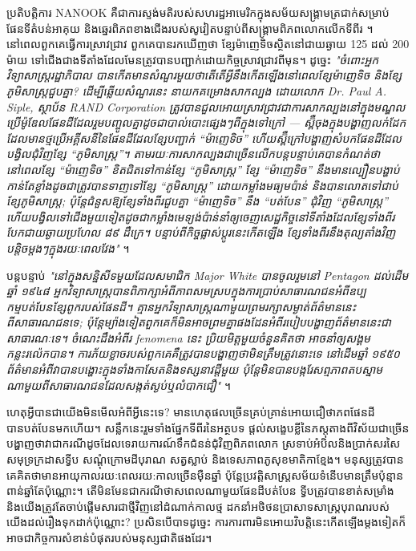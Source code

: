 \documentclass[10pt,twocolumn,letterpaper]{article}
\begin{document}
ប្រតិបត្តិការ NANOOK គឺជាការស្ទង់មតិរបស់សហរដ្ឋអាមេរិកក្នុងសម័យសង្គ្រាមត្រជាក់សម្រាប់ផែនទីតំបន់អាគុយ និងឆ្នេរពិភពខាងជើងរបស់សូវៀតបន្ទាប់ពីសង្គ្រាមពិភពលោកលើកទីពីរ \cite{137}។ នៅពេលពួកគេធ្វើការស្រាវជ្រាវ ពួកគេបានរកឃើញថា ខ្សែម៉ាញេទិចស្ថិតនៅជាយឆ្ងាយ 125 ដល់ 200 ម៉ាយ ទៅជើងជាងទីតាំងដែលមែនត្រូវបានបញ្ជាក់ដោយកិច្ចស្រាវជ្រាវពីមុន។ ដូច្នេះ \textit{"ចំពោះអ្នកវិទ្យាសាស្ត្ររដ្ឋាភិបាល បានកើតមានសំណួរមួយថាតើតើអ្វីនឹងកើតឡើងនៅពេលខ្សែម៉ាញេទិច និងខ្សែភូមិសាស្ត្រជួបគ្នា? ដើម្បីឆ្លើយសំណួរនេះ នាយកគម្រោងសាកល្បង ដោយលោក Dr. Paul A. Siple, ស្ថាប័ន RAND Corporation ត្រូវបានជួលអោយស្រាវជ្រាវជាការសាកល្បងនៅក្នុងមណ្ឌល ប្រើម៉ូឌែលផែនដីដែលរួមបញ្ចូលគ្នាដូចជាបាល់បោះផ្សេងៗពីក្នុងទៅក្រៅ — ស្ព៊ឺចុងក្នុងបង្ហាញលក់ដែកដែលមានថ្មប្រើអគ្គីសនីនៃផែនដីដែលខ្សែបញ្ជាក់ “ម៉ាញេទិច” ហើយស្ព៊ឺក្រៅបង្ហាញសំបកផែនដីដែលបង្វិលជុំវិញខ្សែ “ភូមិសាស្ត្រ”។ តាមរយៈការសាកល្បងជាច្រើនលើកបន្តបន្ទាប់គេបានកំណត់ថា នៅពេលខ្សែ “ម៉ាញេទិច” ខិតជិតទៅកាន់ខ្សែ “ភូមិសាស្ត្រ” ខ្សែ “ម៉ាញេទិច” នឹងមានល្បឿនបង្ហាប់កាន់តែខ្លាំងដូចជាត្រូវបានទាញទៅខ្សែ “ភូមិសាស្ត្រ” ដោយកម្លាំងមធ្យមប៉ាន់ និងបានលោតទៅជាប់ខ្សែភូមិសាស្ត្រ; ប៉ុន្តែជំនួសឱ្យខ្សែទាំងពីរជួបគ្នា “ម៉ាញេទិច” នឹង “បត់បែន” ជុំវិញ “ភូមិសាស្ត្រ” ហើយបង្វិលទៅជើងមួយទៀតដូចជាកម្លាំងមេទ្យង់ប៉ាន់នាំឲ្យចេញសេដ្ឋកិច្ចនៅទីតាំងដែលខ្សែទាំងពីរបែកជាយឆ្ងាយប្រហែល ៨៩ ដឺក្រេ។ បន្ទាប់ពីកិច្ចផ្លាស់ប្តូរនេះកើតឡើង ខ្សែទាំងពីរនឹងតុល្យតាំងវិញបន្តិចម្តងៗក្នុងរយៈពេលវែង"} \cite{138,139}។

បន្តបន្ទាប់ \textit{"នៅក្នុងសន្និសីទមួយដែល​សមាជិក Major White បានចូលរួមនៅ Pentagon ដល់ដើមឆ្នាំ ១៩៤៨ អ្នកវិទ្យាសាស្ត្របានពិភាក្សាអំពីភាពសមស្របក្នុងការប្រាប់សាធារណជនអំពីឧប្បកម្មបត់បែនខ្សែពូករបស់ផែនដី។ គ្មានអ្នកវិទ្យាសាស្ត្រណាមួយព្រមរក្សាសម្ងាត់ព័ត៌មាននេះពីសាធារណជនទេ; ប៉ុន្តែម្យ៉ាងទៀតពួកគេក៏មិនអាចព្រមគ្នាផងដែនអំពីរបៀបបង្ហាញព័ត៌មាននេះជាសាធារណៈទេ។ ចំណេះដឹងអំពីរ fenomena នេះ ប្រិយមិត្តមួយចំនួនគិតថា អាចនាំឲ្យសង្គមកន្លះរល៉េកបាន។ ការភ័យខ្លាចរបស់ពួកគេគឺត្រូវបានបង្ហាញថាមិនត្រឹមត្រូវនោះទេ នៅដើមឆ្នាំ ១៩៥០ ព័ត៌មានអំពីវាបានបង្ហោះក្នុងទាំងកាសែតនិងទស្សនាវដ្តីមួយ ប៉ុន្តែមិនបានបង្ករែសព្មភាពតបស្នាមណាមួយពីសាធារណជនដែលសង្កត់ស្ងប់ឬលំបាកជឿ"} \cite{138,139}។

ហេតុអ្វីបានជា​យើងមិនមើលអំពីអ្វីនេះទេ? មានហេតុផលច្រើនគ្រប់គ្រាន់អោយជឿថាភពផែនដីបានបត់បែនមកហើយ។ សន្លឹកនេះរួមទាំងផ្នែកទីពីរនៃអត្ថបទ ផ្ដល់សង្ខេបខ្លីនៃភស្តុតាងពីវិស័យជាច្រើនបង្ហាញថាវាជាករណីដូចដែលទេ​រាយការណ៍ទឹកជំនន់ជុំវិញពិភពលោក ស្រទាប់អំបិលនិងប្រាក់សរសៃសមុទ្រក្រដាសទ្វីប សណ្ដុំក្រោមដីបុរាណ សត្វស្លាប់ និងទេសភាពភូសុខមាតិកាខ្មែង។ មនុស្សត្រូវបានគេ​គិតថាមានអាយុកាលរយៈពេលរយ:កាលច្រើនម៉ឺនឆ្នាំ ប៉ុន្តែប្រវត្តិសាស្ត្រសម័យទំនើបមានត្រឹមប៉ុន្មានពាន់ឆ្នាំតែប៉ុណ្ណោះ។ តើមិនមែនជាករណីថាសពេលណាមួយផែនដីបត់បែន ទ្វីបត្រូវបានខាត់សម្រាំង និងយើងត្រូវតែចាប់ផ្តើមសារជាថ្មីវិញនៅដំណាក់កាលថ្ម ដកនាំអថិថនប្រាសាទសាស្ត្របុរាណរបស់យើងដល់រឿងទុកដាក់ប៉ុណ្ណោះ? ប្រសិនបើបាទដូច្នេះ ការការពារមិនអោយវិបត្តិនេះកើតឡើងម្ដងទៀតក៏អាចជាកិច្ចការសំខាន់បំផុតរបស់មនុស្សជាតិផងដែរ។
\end{document}
